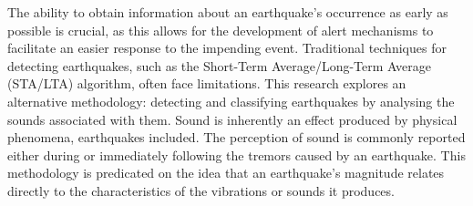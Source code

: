 {The ability to obtain information about an earthquake’s occurrence as early as possible is crucial, as this allows for the development of alert mechanisms to facilitate an easier response to the impending event. Traditional techniques for detecting earthquakes, such as the Short-Term Average/Long-Term Average (STA/LTA) algorithm, often face limitations. This research explores an alternative methodology: detecting and classifying earthquakes by analysing the sounds associated with them. Sound is inherently an effect produced by physical phenomena, earthquakes included. The perception of sound is commonly reported either during or immediately following the tremors caused by an earthquake. This methodology is predicated on the idea that an earthquake’s magnitude relates directly to the characteristics of the vibrations or sounds it produces.
}

\vspace{0.6cm}
\vspace{0.2cm}

